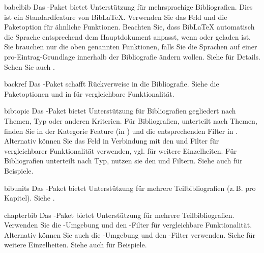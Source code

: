 \documentclass{ltxdockit}[2011/03/25]
\newcommand*{\biblatex}{BibLaTeX\xspace}
\begin{document}
\begin{marglist}

%

\item[babelbib]
Das -Paket bietet Unterstützung für mehrsprachige
Bibliografien. Dies ist ein Standardfeature von \biblatex. Verwenden Sie
das Feld  und die Paketoption  für ähnliche
Funktionen. Beachten Sie, dass \biblatex automatisch die Sprache
entsprechend dem Hauptdokument anpasst, wenn  oder 
geladen ist. Sie
brauchen nur die oben genannten Funktionen, falls Sie die Sprachen auf einer
pro-Eintrag-Grundlage innerhalb der Bibliografie ändern wollen. Siehe
 für Details. Sehen Sie auch . 

\item[backref] 
Das -Paket schafft Rückverweise in die
Bibliografie. Siehe die Paketoptionen  und  in
 für vergleichbare Funktionalität.

\item[bibtopic] 
Das -Paket bietet Unterstützung für Bibliografien
gegliedert nach Themen, Typ oder anderen Kriterien. Für  Bibliografien,
unterteilt nach Themen, finden Sie in der Kategorie Feature (in
) und die entsprechenden Filter in .
Alternativ können Sie das Feld  in Verbindung mit den
 und  Filter für vergleichbarer Funktionalität
verwenden, vgl.  für weitere Einzelheiten. Für
Bibliografien unterteilt nach Typ, nutzen sie den  und 
Filtern. Siehe auch  für Beispiele.

\item[bibunits]
Das -Paket bietet Unterstützung für mehrere
Teilbibliografien (z.\,B. pro Kapitel). Siehe . 

\item[chapterbib] 
Das -Paket bietet Unterstützung für mehrere
Teilbibliografien. Verwenden Sie die -Umgebung und den
-Filter für vergleichbare Funktionalität. Alternativ können Sie
auch die -Umgebung und den -Filter verwenden. Siehe
 für weitere Einzelheiten. Siehe
auch  für Beispiele. 


\end{marglist}
\end{document}
